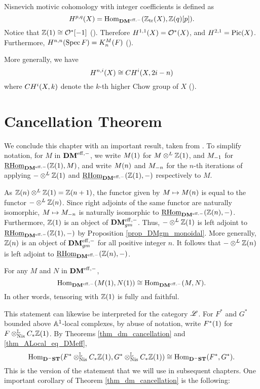\begin{rmk}\label{rmk_mot_coh}
Nisnevich motivic cohomology with integer coefficients is defined
as
\[
\MH^{p, q}(X) = \homDMf(\Ztr(X), \Z(q)[p]).
\]
Notice that $\Z(1) \cong \O^*[-1]$ (\cite[4.1]{MVW}).
Therefore $\MH^{1,1}(X) = \O^*(X)$, and $\MH^{2,1} = \Pic(X)$.
Furthermore, $\MH^{n,n}(\Spec F) = \milK_n(F)$ 
(\cite[5.1]{MVW}).

More generally, we have
\[
\MH^{n, i}(X) \cong \CH^i(X, 2i - n)
\]
where $\CH^i(X, k)$ denote the $k$-th higher Chow group of $X$
(\cite[19.1]{MVW}).
\end{rmk}

\section{Cancellation Theorem}
\label{sect_cancellation}

We conclude this chapter with an important result, taken from
\cite[Corollary 4.10]{V02}. To simplify notation, for $M$ in 
$\DMeff$, we write $\tZ{M}$ for $M \tDM \Z(1)$, and $\hZ{M}$ for 
$\ihomDMf(\Z(1), M)$, and write $\tZ[n]{M}$ and $\hZ[n]{M}$ for 
the $n$-th iterations of applying $- \tDM \Z(1)$ and 
$\ihomDMf(\Z(1), -)$ respectively to $M$. 

As $\Z(n) \tDM \Z(1) = \Z(n + 1)$, the functor given by $M \mapsto 
\tZ[n]{M}$ is equal to the functor $- \tDM \Z(n)$. Since right 
adjoints of the same functor are naturally isomorphic, $M \mapsto 
\hZ[n]{M}$ is naturally isomorphic to $\ihomDMf(\Z(n), -)$. 
Furthermore, $\Z(1)$ is an object of $\DMeffgm$. Thus, $- \tDM 
\Z(1)$ is left adjoint to $\ihomDMf(\Z(1), -)$ by Proposition
\ref{prop_DMgm_monoidal}. More generally, $\Z(n)$ is an object
of $\DMeffgm$ for all positive integer $n$. It follows that
$-\tDM \Z(n)$ is left adjoint to $\ihomDMf(\Z(n), -)$.

\begin{thm}[Cancellation]\label{thm_dm_cancellation}
For any $M$ and $N$ in $\DMeff$,
\[
\homDMf(\tZ{M}, \tZ{N}) \cong \homDMf(M, N).
\]
In other words, tensoring with $\Z(1)$ is fully and faithful.
\end{thm}

This statement can likewise be interpreted for the category 
$\ALocal$. For $F^*$ and $G^*$ bounded above $\A^1$-local 
complexes, by abuse of notation, write $\tZ{F^*}$ for
$F \tLNis \suslC \Z(1)$. By Theorems \ref{thm_dm_cancellation}
and \ref{thm_ALocal_eq_DMeff}, 
\[
\hom_{\DShCor}(F^* \tLNis \suslC \Z(1), G^* \tLNis \suslC \Z(1))
\cong \hom_{\DShCor}(F^*, G^*).
\]
This is the version of the statement that we will use in
subsequent chapters. One important corollary of Theorem
\ref{thm_dm_cancellation} is the following:

